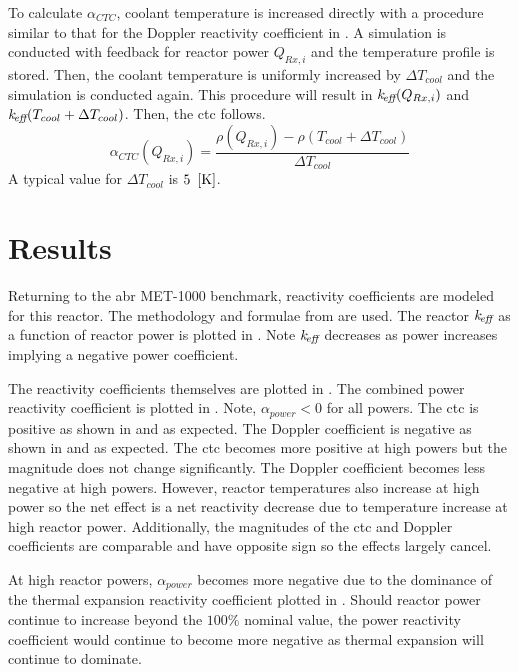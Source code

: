    To calculate $\alpha_{CTC}$, coolant temperature is increased directly with
    a procedure similar to that for the Doppler reactivity coefficient in
    . A simulation is
    conducted with feedback for reactor power $Q_{Rx,i}$ and the temperature
    profile is stored. Then, the coolant temperature is uniformly increased by
    $\Delta T_{cool}$ and the simulation is conducted again. This procedure will
    result in $k_{\!\mbox{\scriptsize \em eff}}(Q_{Rx,i})$ and ${k_{\!\mbox{\scriptsize \em eff}}(T_{cool} + \Delta T_{cool})}$. Then,
    the \gls{ctc} follows.
    \begin{equation}
      \label{eq:coolant_temperature_reactivity_coefficient}
      \alpha_{CTC}(Q_{Rx,i}) = \frac{\rho(Q_{Rx,i}) - \rho(T_{cool} + 
        \Delta T_{cool})} {\Delta T_{cool}}
    \end{equation}
    A typical value for $\Delta T_{cool}$ is $5~\left[\text{{K}}\right]$.

\section{Results}
\label{sec:results}
  Returning to the \gls{abr} MET-1000 benchmark, reactivity coefficients are
  modeled for this reactor. The methodology and formulae from
   are used. The reactor $k_{\!\mbox{\scriptsize \em eff}}$ as a function
  of reactor power is plotted in . Note $k_{\!\mbox{\scriptsize \em eff}}$ decreases
  as power increases implying a negative power coefficient.
  
  The reactivity coefficients themselves are plotted in
  . The combined power reactivity
  coefficient is plotted in . Note,
  $\alpha_{power} < 0$ for all powers.  The \gls{ctc} is positive as shown in
   and as expected.  The
  Doppler coefficient is negative as shown in
   and as expected. The \gls{ctc}
  becomes more positive at high powers but the magnitude does not change
  significantly. The Doppler coefficient becomes less negative at high powers.
  However, reactor temperatures also increase at high power so the net effect is 
  a net reactivity decrease due to temperature increase at high reactor power.
  Additionally, the magnitudes of the \gls{ctc} and Doppler coefficients are
  comparable and have opposite sign so the effects largely cancel.
  
  At high reactor powers, $\alpha_{power}$ becomes more negative due to the
  dominance of the thermal expansion reactivity coefficient plotted in
  . Should reactor power
  continue to increase beyond the $100\%$ nominal value, the power reactivity
  coefficient would continue to become more negative as thermal expansion will
  continue to dominate.

